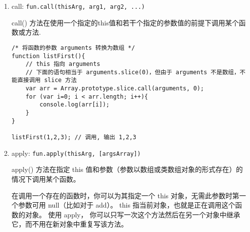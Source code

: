 \begin{enumerate}
\def\labelenumi{\arabic{enumi}.}
\item
  call: \lstinline!fun.call(thisArg, arg1, arg2, ...)!

  call()
  方法在使用一个指定的this值和若干个指定的参数值的前提下调用某个函数或方法.


\begin{lstlisting}
/* 将函数的参数 arguments 转换为数组 */
function listFirst(){
    // this 指向 arguments
    // 下面的语句相当于 arguments.slice(0)，但由于 arguments 不是数组，不能直接调用 slice 方法
    var arr = Array.prototype.slice.call(arguments, 0);
    for (var i=0; i < arr.length; i++){
        console.log(arr[i]);
    }
}

listFirst(1,2,3); // 调用, 输出 1,2,3
\end{lstlisting}
\item
  apply: \lstinline!fun.apply(thisArg, [argsArray])!

  apply() 方法在指定 this
  值和参数（参数以数组或类数组对象的形式存在）的情况下调用某个函数。


  在调用一个存在的函数时，你可以为其指定一个 this
  对象，无需此参数时第一个参数可用 null（比如对于 add）。 this
  指当前对象，也就是正在调用这个函数的对象。 使用 apply，
  你可以只写一次这个方法然后在另一个对象中继承它，而不用在新对象中重复写该方法。


\end{enumerate}
